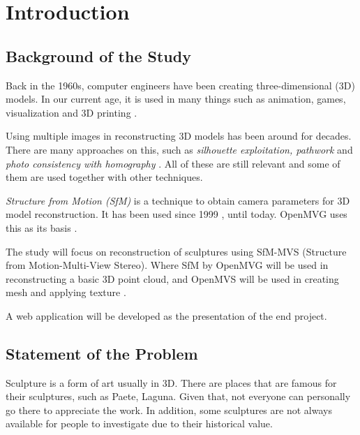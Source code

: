 \documentclass[journal]{./IEEE/IEEEtran}
\title{\SPTITLE}
\author{\ADVISEE~and~\ADVISER%
}
\begin{document}
\maketitle


\section{Introduction}

\subsection{Background of the Study}
Back in the 1960s, computer engineers have been creating three-dimensional (3D) models. In our current age, it is used in many things such as animation, games, visualization and 3D printing \cite{Archicgi}.

Using multiple images in reconstructing 3D models has been around for decades. There are many approaches on this, such as \textit{silhouette exploitation, pathwork} and \textit{photo consistency with homography} \cite{Paris}. All of these are still relevant and some of them are used together with other techniques.

\textit{Structure from Motion (SfM)} is a technique to obtain camera parameters for 3D model reconstruction. It has been used since 1999 \cite{Jebaraa}, until today. OpenMVG uses this as its basis \cite{OpenMVG}.

The study will focus on reconstruction of sculptures using SfM-MVS (Structure from Motion-Multi-View Stereo). Where SfM by OpenMVG will be used in reconstructing a basic 3D point cloud, and OpenMVS will be used in creating mesh and applying texture \cite{OpenMVS}.

A web application will be developed as the presentation of the end project.

\subsection{Statement of the Problem}
Sculpture is a form of art usually in 3D. There are places that are famous for their sculptures, such as Paete, Laguna. Given that, not everyone can personally go there to appreciate the work. In addition, some sculptures are not always available for people to investigate due to their historical value. \cite{art}
\end{document}
